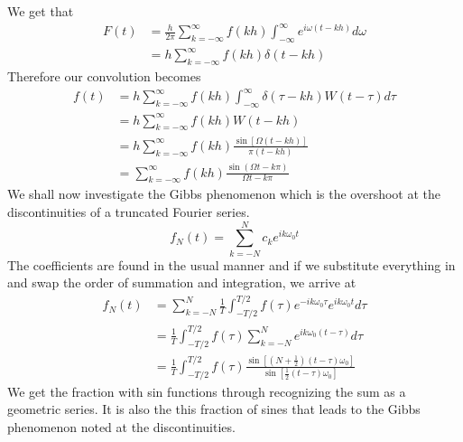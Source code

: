 \documentclass{report}
\theoremstyle{definition}
\theoremstyle{remark}
\begin{document}
We get that 
\begin{equation*}
    \begin{split}
        F(t) &= \frac{h}{2\pi}\sum^\infty_{k=-\infty}f(kh)\int^\infty_{-\infty}e^{i\omega (t-kh)}d\omega \\
        &= h \sum^\infty_{k=-\infty}f(kh)\delta (t-kh)
    \end{split}
\end{equation*}
Therefore our convolution becomes 
\begin{equation*}
    \begin{split}
        f(t)&=h\sum^\infty_{k=-\infty}f(kh)\int^\infty_{-\infty}\delta (\tau-kh)W(t-\tau)d\tau \\
        &=h\sum^\infty_{k=-\infty}f(kh)W(t-kh) \\
        &=h\sum^\infty_{k=-\infty}f(kh)\frac{\sin[\Omega(t-kh)]}{\pi(t-kh)} \\
        &= \sum^\infty_{k=-\infty} f(kh)\frac{\sin(\Omega t-k\pi)}{\Omega t-k\pi}
    \end{split}
\end{equation*}
We shall now investigate the Gibbs phenomenon which is the overshoot at the discontinuities of a truncated Fourier series. 
\begin{equation*}
    f_N(t) = \sum^N_{k=-N}c_ke^{ik\omega_0t}
\end{equation*}
The coefficients are found in the usual manner and if we substitute everything in and swap the order of summation and integration, we arrive at 
\begin{equation*}
    \begin{split}
        f_N(t)&= \sum^N_{k=-N}\frac{1}{T} \int^{T/2}_{-T/2}f(\tau)e^{-ik\omega_0\tau}e^{ik\omega_0t}d\tau \\
        &= \frac{1}{T}\int^{T/2}_{-T/2}f(\tau)\sum^N_{k=-N}e^{ik\omega_0(t-\tau)}d\tau \\
        &=\frac{1}{T} \int^{T/2}_{-T/2}f(\tau)\frac{\sin\left[ (N+\frac{1}{2})(t-\tau)\omega_0\right]}{\sin\left[ \frac{1}{2}(t-\tau)\omega_0\right]}
    \end{split}
\end{equation*}
We get the fraction with sin functions through recognizing the sum as a geometric series. It is also the this fraction of sines that leads to the Gibbs phenomenon noted at the discontinuities. 
\end{document}
